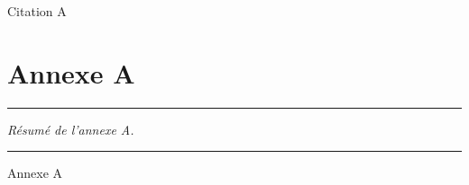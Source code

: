 
\appendix
\renewcommand\chaptername{Annexe~}

\lhead[\fancyplain{}{\leftmark}]%
      {\fancyplain{}{}} %
\chead[\fancyplain{}{}]%
      {\fancyplain{}{}}
\rhead[\fancyplain{}{}]%
      {\fancyplain{}{\rightmark}}%
\lfoot[\fancyplain{}{}]%
      {\fancyplain{}{}}
\cfoot[\fancyplain{}{\thepage}]%
      {\fancyplain{}{\thepage}} %
\rfoot[\fancyplain{}{}]%
     {\fancyplain{}{\scriptsize}}



\begin{savequote}[45mm]
Citation A
\end{savequote}

\chapter{Annexe A}
\label{an:A}


\begin{center}
\rule{0.7\linewidth}{.5pt}
\begin{minipage}{0.7\linewidth}
\smallskip

\textit{
Résumé de l'annexe A.
}

\end{minipage}
\smallskip
\rule{0.7\linewidth}{.5pt}
\end{center}

{}
\adjustmtc[4]
\minitoc
\adjustmtc[-4]
\minilof
\minilot
\newpage


Annexe A


